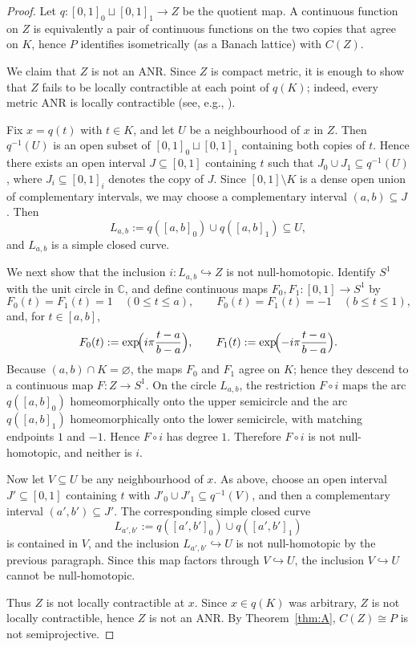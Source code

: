 \documentclass[11pt]{amsart}
\renewcommand{\le}{\leqslant}
\numberwithin{equation}{section}
\theoremstyle{definition}
\theoremstyle{remark}
\theoremstyle{plain}
\begin{document}
\begin{proof}
Let \(q\colon [0,1]_0\sqcup[0,1]_1\to Z\) be the quotient map.
A continuous function on \(Z\) is equivalently a pair of continuous functions on the two copies
that agree on \(K\), hence \(P\) identifies isometrically (as a Banach lattice) with \(C(Z)\).

We claim that \(Z\) is not an ANR. Since \(Z\) is compact metric, it is enough to show that
\(Z\) fails to be locally contractible at each point of \(q(K)\); indeed, every metric ANR is
locally contractible (see, e.g., \cite{hanner-anr,borsuk}).

Fix \(x=q(t)\) with \(t\in K\), and let \(U\) be a neighbourhood of \(x\) in \(Z\).
Then \(q^{-1}(U)\) is an open subset of \([0,1]_0\sqcup[0,1]_1\) containing both copies of \(t\).
Hence there exists an open interval \(J\subseteq[0,1]\) containing \(t\) such that
\(J_0\cup J_1\subseteq q^{-1}(U)\), where \(J_i\subseteq[0,1]_i\) denotes the copy of \(J\).
Since \([0,1]\setminus K\) is a dense open union of complementary intervals, we may choose a
complementary interval \((a,b)\subseteq J\). Then
\[
L_{a,b}:=q([a,b]_0)\cup q([a,b]_1)\subseteq U,
\]
and \(L_{a,b}\) is a simple closed curve.

We next show that the inclusion \(i\colon L_{a,b}\hookrightarrow Z\) is not null-homotopic.
Identify \(S^1\) with the unit circle in \(\mathbb C\), and define continuous maps
\(F_0,F_1\colon[0,1]\to S^1\) by
\[
F_0(t)=F_1(t)=1 \quad (0\le t\le a),\qquad
F_0(t)=F_1(t)=-1 \quad (b\le t\le 1),
\]
and, for \(t\in[a,b]\),
\[
F_0(t):=\exp\!\Bigl(i\pi \frac{t-a}{b-a}\Bigr),\qquad
F_1(t):=\exp\!\Bigl(-i\pi \frac{t-a}{b-a}\Bigr).
\]
Because \((a,b)\cap K=\varnothing\), the maps \(F_0\) and \(F_1\) agree on \(K\); hence they
descend to a continuous map \(F\colon Z\to S^1\). On the circle \(L_{a,b}\), the restriction
\(F\circ i\) maps the arc \(q([a,b]_0)\) homeomorphically onto the upper semicircle and the arc
\(q([a,b]_1)\) homeomorphically onto the lower semicircle, with matching endpoints \(1\) and \(-1\).
Hence \(F\circ i\) has degree \(1\). Therefore \(F\circ i\) is not null-homotopic, and neither is \(i\).

Now let \(V\subseteq U\) be any neighbourhood of \(x\). As above, choose an open interval
\(J'\subseteq[0,1]\) containing \(t\) with \(J'_0\cup J'_1\subseteq q^{-1}(V)\), and then a
complementary interval \((a',b')\subseteq J'\). The corresponding simple closed curve
\[
L_{a',b'}:=q([a',b']_0)\cup q([a',b']_1)
\]
is contained in \(V\), and the inclusion \(L_{a',b'}\hookrightarrow U\) is not null-homotopic
by the previous paragraph. Since this map factors through \(V\hookrightarrow U\), the inclusion
\(V\hookrightarrow U\) cannot be null-homotopic.

Thus \(Z\) is not locally contractible at \(x\). Since \(x\in q(K)\) was arbitrary, \(Z\) is not
locally contractible, hence \(Z\) is not an ANR. By Theorem~\ref{thm:A}, \(C(Z)\cong P\) is not
semiprojective.
\end{proof}
\end{document}
